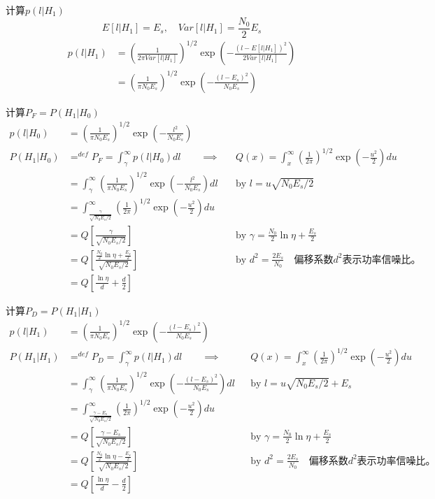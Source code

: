 \begin{frame}{计算$p(l|H_1)$}
\[ E[l|H_1]=E_s,\quad Var[l|H_1]=\frac{N_0}{2}E_s \]
\begin{align*}
	p(l|H_1)&=\left(\frac{1}{2\pi Var[l|H_1]}\right)^{1/2}\exp\left(-\frac{(l-E[l|H_1])^2}{2Var[l|H_1]}\right)\\
	&=\left(\frac{1}{\pi N_0E_s}\right)^{1/2}\exp\left(-\frac{(l-E_s)^2}{N_0E_s}\right)
\end{align*}
\end{frame}

\begin{frame}[shrink]{计算$P_F=P(H_1|H_0)$}
\begin{align*}
p(l|H_0)&=\left(\frac{1}{\pi N_0E_s}\right)^{1/2}\exp\left(-\frac{l^2}{N_0E_s}\right)\\
P(H_1|H_0)&\mathop{=}^{def}P_F=\int_{\gamma}^{\infty}p(l|H_0)dl\qquad \implies&& Q(x)=\int_{x}^{\infty}\left(\frac{1}{2\pi}\right)^{1/2}\exp\left(-\frac{u^2}{2}\right)du\\
&=\int_{\gamma}^{\infty}\left(\frac{1}{\pi N_0E_s}\right)^{1/2}\exp\left(-\frac{l^2}{N_0E_s}\right)dl&&\text{by }l=u\sqrt{N_0E_s/2}\\
&=\int_{\frac{\gamma}{\sqrt{N_0E_s/2}}}^{\infty}\left(\frac{1}{2\pi}\right)^{1/2}\exp\left(-\frac{u^2}{2}\right)du\\
&=Q\left[\frac{\gamma}{\sqrt{N_0E_s/2}}\right]&&\text{by }\gamma=\frac{N_0}{2}\ln\eta+\frac{E_s}{2}\\
&=Q\left[\frac{\frac{N_0}{2}\ln\eta+\frac{E_s}{2}}{\sqrt{N_0E_s/2}}\right]&&\text{by }d^2=\frac{2E_s}{N_0}\quad \text{偏移系数$d^2$表示功率信噪比。}\\
&=Q\left[\frac{\ln\eta}{d}+\frac{d}{2}\right] 
\end{align*}
\end{frame}

\begin{frame}[shrink]{计算$P_D=P(H_1|H_1)$}
\begin{align*}
p(l|H_1)&=\left(\frac{1}{\pi N_0E_s}\right)^{1/2}\exp\left(-\frac{(l-E_s)^2}{N_0E_s}\right)\\
P(H_1|H_1)&\mathop{=}^{def}P_D=\int_{\gamma}^{\infty}p(l|H_1)dl\qquad \implies&& Q(x)=\int_{x}^{\infty}\left(\frac{1}{2\pi}\right)^{1/2}\exp\left(-\frac{u^2}{2}\right)du\\
&=\int_{\gamma}^{\infty}\left(\frac{1}{\pi N_0E_s}\right)^{1/2}\exp\left(-\frac{(l-E_s)^2}{N_0E_s}\right)dl&&\text{by }l=u\sqrt{N_0E_s/2}+E_s\\
&=\int_{\frac{\gamma-E_s}{\sqrt{N_0E_s/2}}}^{\infty}\left(\frac{1}{2\pi}\right)^{1/2}\exp\left(-\frac{u^2}{2}\right)du\\
&=Q\left[\frac{\gamma-E_s}{\sqrt{N_0E_s/2}}\right]&&\text{by }\gamma=\frac{N_0}{2}\ln\eta+\frac{E_s}{2}\\
&=Q\left[\frac{\frac{N_0}{2}\ln\eta-\frac{E_s}{2}}{\sqrt{N_0E_s/2}}\right]&&\text{by }d^2=\frac{2E_s}{N_0}\quad \text{偏移系数$d^2$表示功率信噪比。}\\
&=Q\left[\frac{\ln\eta}{d}-\frac{d}{2}\right]
\end{align*}
\end{frame}
